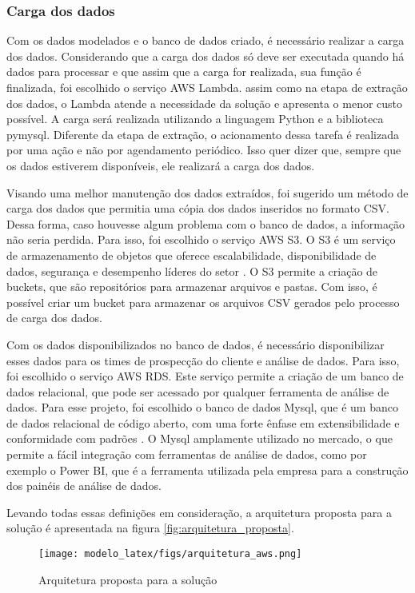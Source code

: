 \subsubsection{Carga dos dados}

Com os dados modelados e o banco de dados criado, é necessário realizar a carga dos dados. Considerando que a carga dos dados só deve ser executada quando há dados para processar e que assim que a carga for realizada, sua função é finalizada, foi escolhido o serviço AWS Lambda. assim como na etapa de extração dos dados, o Lambda atende a necessidade da solução e apresenta o menor custo possível. A carga será realizada utilizando a linguagem Python e a biblioteca pymysql. Diferente da etapa de extração, o acionamento dessa tarefa é realizada por uma ação e não por agendamento periódico. Isso quer dizer que, sempre que os dados estiverem disponíveis, ele realizará a carga dos dados.

Visando uma melhor manutenção dos dados extraídos, foi sugerido um método de carga dos dados que permitia uma cópia dos dados inseridos no formato CSV. Dessa forma, caso houvesse algum problema com o banco de dados, a informação não seria perdida. Para isso, foi escolhido o serviço AWS S3. O S3 é um serviço de armazenamento de objetos que oferece escalabilidade, disponibilidade de dados, segurança e desempenho líderes do setor \cite{S3}. O S3 permite a criação de buckets, que são repositórios para armazenar arquivos e pastas. Com isso, é possível criar um bucket para armazenar os arquivos CSV gerados pelo processo de carga dos dados.

Com os dados disponibilizados no banco de dados, é necessário disponibilizar esses dados para os times de prospecção do cliente e análise de dados. Para isso, foi escolhido o serviço AWS RDS. Este serviço permite a criação de um banco de dados relacional, que pode ser acessado por qualquer ferramenta de análise de dados. Para esse projeto, foi escolhido o banco de dados Mysql, que é um banco de dados relacional de código aberto, com uma forte ênfase em extensibilidade e conformidade com padrões \cite{MySQL}. O Mysql amplamente utilizado no mercado, o que permite a fácil integração com ferramentas de análise de dados, como por exemplo o Power BI, que é a ferramenta utilizada pela empresa para a construção dos painéis de análise de dados.

Levando todas essas definições em consideração, a arquitetura proposta para a solução é apresentada na figura \ref{fig:arquitetura_proposta}.

\begin{figure}[H]
    \centering
    \texttt{[image: modelo\_latex/figs/arquitetura\_aws.png]}
    \caption{Arquitetura proposta para a solução}
    \label{fig:arquitetura_aws}
\end{figure}